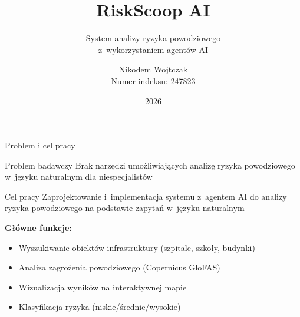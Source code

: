 \documentclass[aspectratio=169]{beamer}
\title[RiskScoop AI]{RiskScoop AI}
\subtitle{System analizy ryzyka powodziowego\\z~wykorzystaniem agentów AI}
\author[Nikodem Wojtczak]{Nikodem Wojtczak\\Numer indeksu: 247823}
\institute{Promotor: dr~inż. Piotr Mielczarski}
\date[2026]{2026}
\begin{document}
\begin{frame}
    \titlepage
\end{frame}

\begin{frame}{Problem i cel pracy}
\begin{block}{Problem badawczy}
Brak narzędzi umożliwiających analizę ryzyka powodziowego w~języku naturalnym dla niespecjalistów
\end{block}

\vspace{0.5cm}

\begin{block}{Cel pracy}
Zaprojektowanie i~implementacja systemu z~agentem AI do analizy ryzyka powodziowego na podstawie zapytań w~języku naturalnym
\end{block}

\vspace{0.5cm}

\textbf{Główne funkcje:}
\begin{itemize}
    \item Wyszukiwanie obiektów infrastruktury (szpitale, szkoły, budynki)
    \item Analiza zagrożenia powodziowego (Copernicus GloFAS)
    \item Wizualizacja wyników na interaktywnej mapie
    \item Klasyfikacja ryzyka (niskie/średnie/wysokie)
\end{itemize}
\end{frame}
\end{document}
